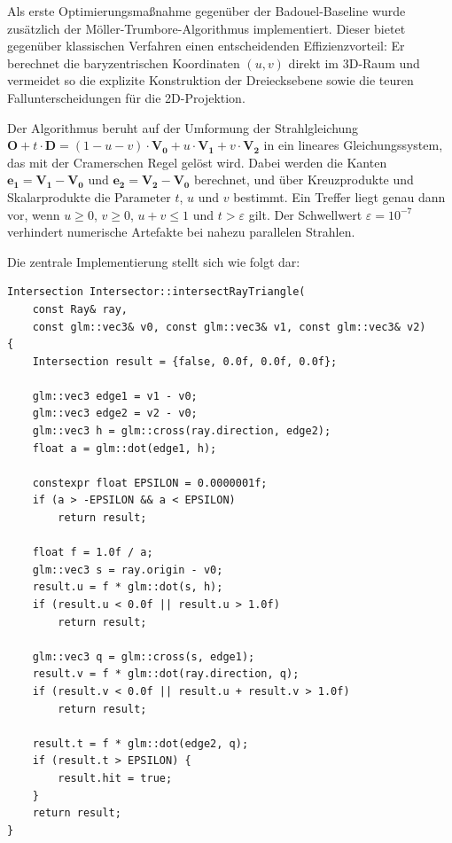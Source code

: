 \documentclass[11pt, a4paper]{article}
\begin{document}
Als erste Optimierungsmaßnahme gegenüber der Badouel-Baseline wurde zusätzlich der Möller-Trumbore-Algorithmus implementiert. Dieser bietet gegenüber klassischen Verfahren einen entscheidenden Effizienzvorteil: Er berechnet die baryzentrischen Koordinaten $(u, v)$ direkt im 3D-Raum und vermeidet so die explizite Konstruktion der Dreiecksebene sowie die teuren Fallunterscheidungen für die 2D-Projektion.

Der Algorithmus beruht auf der Umformung der Strahlgleichung $\mathbf{O} + t \cdot \mathbf{D} = (1 - u - v) \cdot \mathbf{V_0} + u \cdot \mathbf{V_1} + v \cdot \mathbf{V_2}$ in ein lineares Gleichungssystem, das mit der Cramerschen Regel gelöst wird. Dabei werden die Kanten $\mathbf{e_1} = \mathbf{V_1} - \mathbf{V_0}$ und $\mathbf{e_2} = \mathbf{V_2} - \mathbf{V_0}$ berechnet, und über Kreuzprodukte und Skalarprodukte die Parameter $t$, $u$ und $v$ bestimmt. Ein Treffer liegt genau dann vor, wenn $u \geq 0$, $v \geq 0$, $u + v \leq 1$ und $t > \varepsilon$ gilt. Der Schwellwert $\varepsilon = 10^{-7}$ verhindert numerische Artefakte bei nahezu parallelen Strahlen.

Die zentrale Implementierung stellt sich wie folgt dar:

\noindent\begin{minipage}{\textwidth}
\begin{lstlisting}[caption={Möller-Trumbore-Schnittpunkttest}]
Intersection Intersector::intersectRayTriangle(
    const Ray& ray,
    const glm::vec3& v0, const glm::vec3& v1, const glm::vec3& v2)
{
    Intersection result = {false, 0.0f, 0.0f, 0.0f};

    glm::vec3 edge1 = v1 - v0;
    glm::vec3 edge2 = v2 - v0;
    glm::vec3 h = glm::cross(ray.direction, edge2);
    float a = glm::dot(edge1, h);

    constexpr float EPSILON = 0.0000001f;
    if (a > -EPSILON && a < EPSILON)
        return result;

    float f = 1.0f / a;
    glm::vec3 s = ray.origin - v0;
    result.u = f * glm::dot(s, h);
    if (result.u < 0.0f || result.u > 1.0f)
        return result;

    glm::vec3 q = glm::cross(s, edge1);
    result.v = f * glm::dot(ray.direction, q);
    if (result.v < 0.0f || result.u + result.v > 1.0f)
        return result;

    result.t = f * glm::dot(edge2, q);
    if (result.t > EPSILON) {
        result.hit = true;
    }
    return result;
}
\end{lstlisting}
\end{minipage}
\end{document}
